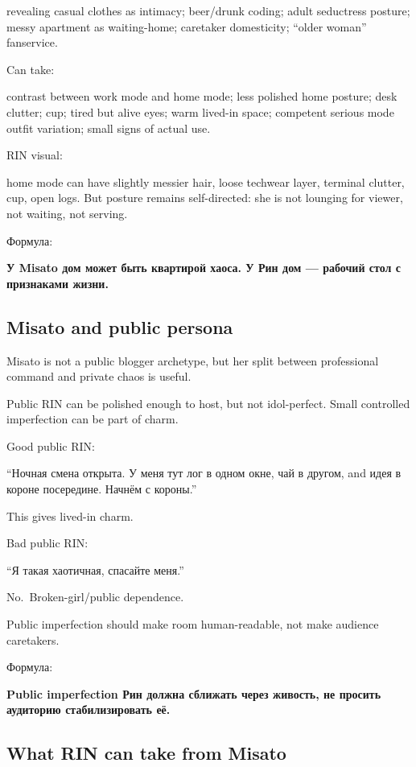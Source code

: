 revealing casual clothes as intimacy; beer/\hspace{0pt}drunk coding; adult
seductress posture; messy apartment as waiting-home; caretaker
domesticity; ``older woman'' fanservice.

Can take:

contrast between work mode and home mode; less polished home posture;
desk clutter; cup; tired but alive eyes; warm lived-in space; competent
serious mode outfit variation; small signs of actual use.

RIN visual:

home mode can have slightly messier hair, loose techwear layer, terminal
clutter, cup, open logs. But posture remains self-directed: she is not
lounging for viewer, not waiting, not serving.

Формула:

\textbf{У Misato дом может быть квартирой хаоса. У Рин дом --- рабочий
стол с признаками жизни.}

\subsection*{Misato and public persona}

Misato is not a public blogger archetype, but her split between
professional command and private chaos is useful.

Public RIN can be polished enough to host, but not idol-perfect. Small
controlled imperfection can be part of charm.

Good public RIN:

``Ночная смена открыта. У меня тут лог в одном окне, чай в другом, and
идея в короне посередине. Начнём с короны.''

This gives lived-in charm.

Bad public RIN:

``Я такая хаотичная, спасайте меня.''

No.~Broken-girl/\hspace{0pt}public dependence.

Public imperfection should make room human-readable, not make audience
caretakers.

Формула:

\textbf{Public imperfection Рин должна сближать через живость, не
просить аудиторию стабилизировать её.}

\subsection*{What RIN can take from Misato}

